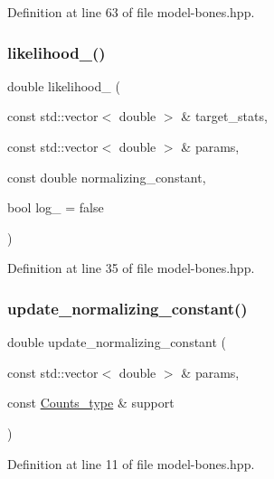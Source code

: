 Definition at line 63 of file model-\/bones.\+hpp.

\mbox{\label{model-bones_8hpp_a30867af87b732210c25b5148a8909454}} 
\subsubsection{\texorpdfstring{likelihood\+\_\+()}{likelihood\_()}}
{\footnotesize\ttfamily double likelihood\+\_\+ (\begin{DoxyParamCaption}\item[{const std\+::vector$<$ double $>$ \&}]{target\+\_\+stats,  }\item[{const std\+::vector$<$ double $>$ \&}]{params,  }\item[{const double}]{normalizing\+\_\+constant,  }\item[{bool}]{log\+\_\+ = {\ttfamily false} }\end{DoxyParamCaption})\hspace{0.3cm}{\ttfamily [inline]}}



Definition at line 35 of file model-\/bones.\+hpp.

\mbox{\label{model-bones_8hpp_a557368a4713ccf9ee1867c1bd17d58ba}} 
\subsubsection{\texorpdfstring{update\+\_\+normalizing\+\_\+constant()}{update\_normalizing\_constant()}}
{\footnotesize\ttfamily double update\+\_\+normalizing\+\_\+constant (\begin{DoxyParamCaption}\item[{const std\+::vector$<$ double $>$ \&}]{params,  }\item[{const \hyperlink{typedefs_8hpp_aee40fa17c1fddb63dd1f2b1470ade95b}{Counts\+\_\+type} \&}]{support }\end{DoxyParamCaption})\hspace{0.3cm}{\ttfamily [inline]}}



Definition at line 11 of file model-\/bones.\+hpp.

